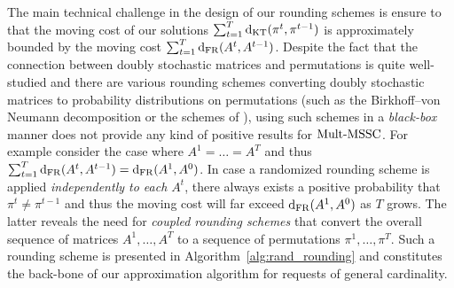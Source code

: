 The main technical challenge in the design of our rounding schemes is ensure to that the moving cost of our solutions $\sum_{t=1}^T\mathrm{d}_{\mathrm{KT}}(\pi^t,\pi^{t-1})$ is approximately bounded by the moving cost $\sum_{t=1}^T\mathrm{d}_{\mathrm{FR}}(A^t,A^{t-1})$. Despite the fact that the connection between 
doubly stochastic matrices and permutations is quite well-studied
and there are various rounding schemes converting doubly stochastic matrices to probability distributions on permutations (such as the Birkhoff–von Neumann decomposition or the schemes of \cite{BGK10,SW11,BBFT20,FKKSV20}), using such schemes in a \textit{black-box} manner does not provide any kind of positive results for $\mathrm{Mult}\text{-}\mathrm{MSSC}$. For example consider the case where $A^1 = \dots = A^T$ and thus $\sum_{t=1}^T \mathrm{d}_{\mathrm{FR}}(A^t,A^{t-1}) = \mathrm{d}_{\mathrm{FR}}(A^1,A^0)$. In case a randomized rounding scheme is applied \textit{independently to each $A^t$}, there always exists a positive probability that $\pi^t \neq \pi^{t-1}$ and thus the moving cost will far exceed $\mathrm{d}_{\mathrm{FR}}(A^1,A^0)$ as $T$ grows. The latter reveals the need for \textit{coupled rounding schemes} that convert the overall sequence of matrices $A^1,\ldots,A^T$ to a sequence of permutations $\pi^1,\ldots,\pi^T$. Such a rounding scheme is presented in Algorithm~\ref{alg:rand_rounding} and constitutes the back-bone of our approximation algorithm for requests of general cardinality.

